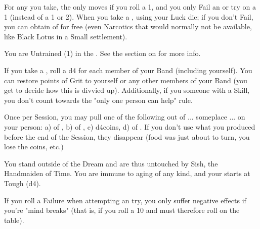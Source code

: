 \begin{multicols*}{2}

    For any  you take, the \UD only moves \DCDOWN if you roll a 1, and you only Fail an  or  try on a 1 (instead of a 1 or 2).  When you take a , \RS using your Luck die; if you don't Fail, you can obtain  of   for free (even Narcotics that would normally not be available, like Black Lotus in a Small settlement).
    


    You are Untrained (1) in the . See the section on  for more info.



    If you take a , roll a d4 for each member of your Band (including yourself). You can restore \SUM points of Grit to yourself or any other members of your Band (you get to decide how this is divvied up).  Additionally, if you  someone with a Skill, you don't count towards the "only one person can help" rule.

\newpage


Once per Session, you may pull one of the following out of ... someplace ... on your person:  a)  of , b)  of , c) d4\AG coins, d)  of . If you don't use what you produced before the end of the Session, they disappear (food was just about to turn, you lose the coins, etc.)


  You stand outside of the Dream and are thus untouched by Sish, the Handmaiden of Time. You are immune to aging of any kind, and your \DEATH starts at Tough (d4).



   If you roll a Failure when attempting an  try, you only suffer negative effects if you're "mind breaks" (that is, if you roll a 10 and must therefore roll on the  table).




\end{multicols*}
